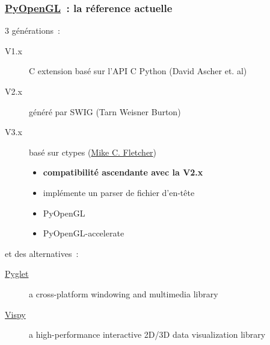 \begin{frame}[fragile]
  \frametitle{\href{http://pyopengl.sourceforge.net}{PyOpenGL}~: la réference actuelle}
  3 générations~:
  \begin{description}
    \item[V1.x] C extension basé sur l'API C Python {\tiny (David Ascher et. al)}
    \item[V2.x] généré par SWIG {\tiny (Tarn Weisner Burton)}
    \item[V3.x] basé sur ctypes {\tiny (\href{http://www.vrplumber.com}{Mike C. Fletcher})}
      \begin{itemize}
      \item \textbf{compatibilité ascendante avec la V2.x}
      \item implémente un parser de fichier d'en-tête
      \item PyOpenGL
      \item PyOpenGL-accelerate
      \end{itemize}
    \end{description}
    \vspace{1em}
    et des alternatives~:
    \begin{description}
    \item[\href{http://www.pyglet.org}{Pyglet}] a cross-platform windowing and multimedia library
    \item[\href{http://vispy.org}{Vispy}] a high-performance interactive 2D/3D data visualization library
    \end{description}
  \note{
    \begin{enumerate}
    \item
    \end{enumerate}
  }
\end{frame}

